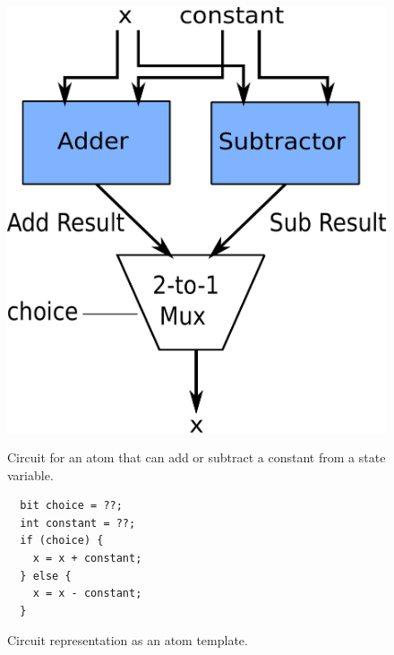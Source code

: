 \begin{figure}[h]
  \begin{minipage}{0.4\columnwidth}
  \begin{center}
  \includegraphics[width=\columnwidth]{circuit.pdf}
  \end{center}
  \caption{Circuit for an atom that can add or subtract a constant from a state variable.}
  \label{fig:alu_diag}
  \end{minipage}
  \hspace{0.05\columnwidth}
  \begin{minipage}{0.55\columnwidth}
  \begin{lstlisting}
  bit choice = ??;
  int constant = ??;
  if (choice) {
    x = x + constant;
  } else {
    x = x - constant;
  }
  \end{lstlisting}
  \caption{Circuit representation as an atom template.}
  \label{fig:alu_in_sketch}
  \end{minipage}
\end{figure}


